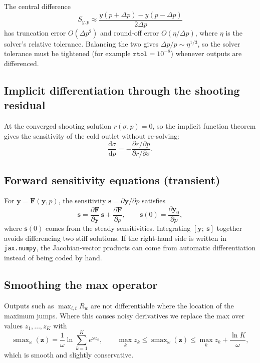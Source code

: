 \documentclass[11pt]{article}
\newcommand{\dd}{\mathrm{d}}
\newcommand{\smax}{\operatorname{smax}}
\begin{document}
The central difference
\begin{equation}
  S_{y,p} \approx \frac{y(p + \Delta p) - y(p - \Delta p)}{2\Delta p}
\end{equation}
has truncation error $O(\Delta p^2)$ and round-off error $O(\eta/\Delta p)$, where $\eta$ is the solver's relative tolerance. Balancing the two gives $\Delta p/p \sim \eta^{1/3}$, so the solver tolerance must be tightened (for example $\texttt{rtol} = 10^{-8}$) whenever outputs are differenced.

\subsection{Implicit differentiation through the shooting residual}

At the converged shooting solution $r(\sigma, p) = 0$, so the implicit function theorem gives the sensitivity of the cold outlet without re-solving:
\begin{equation}
  \frac{\dd\sigma}{\dd p} = -\frac{\partial r/\partial p}{\partial r/\partial\sigma}.
\end{equation}

\subsection{Forward sensitivity equations (transient)}

For $\dot{\bm y} = \bm F(\bm y, p)$, the sensitivity $\bm s = \partial\bm y/\partial p$ satisfies
\begin{equation}
  \dot{\bm s} = \frac{\partial\bm F}{\partial\bm y}\,\bm s + \frac{\partial\bm F}{\partial p},
  \qquad
  \bm s(0) = \frac{\partial\bm y_0}{\partial p},
\end{equation}
where $\bm s(0)$ comes from the steady sensitivities. Integrating $[\bm y;\ \bm s]$ together avoids differencing two stiff solutions. If the right-hand side is written in \texttt{jax.numpy}, the Jacobian-vector products can come from automatic differentiation instead of being coded by hand.

\subsection{Smoothing the max operator}

Outputs such as $\max_{i,t} R_w$ are not differentiable where the location of the maximum jumps. Where this causes noisy derivatives we replace the max over values $z_1,\dots,z_K$ with
\begin{equation}
  \smax_\omega(\bm z) = \frac{1}{\omega}\ln\sum_{k=1}^{K} e^{\omega z_k},
  \qquad
  \max_k z_k \le \smax_\omega(\bm z) \le \max_k z_k + \frac{\ln K}{\omega},
\end{equation}
which is smooth and slightly conservative.
\end{document}

